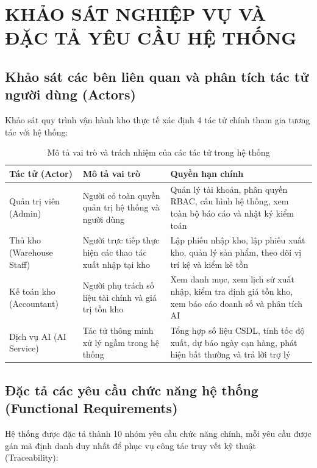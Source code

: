 \chapter{KHẢO SÁT NGHIỆP VỤ VÀ ĐẶC TẢ YÊU CẦU HỆ THỐNG}

\section{Khảo sát các bên liên quan và phân tích tác tử người dùng (Actors)}

Khảo sát quy trình vận hành kho thực tế xác định 4 tác tử chính tham gia tương tác với hệ thống:

\begin{table}[h!]
\centering
\caption{Mô tả vai trò và trách nhiệm của các tác tử trong hệ thống}
\begin{tabular}{|l|l|l|}
\hline
\rowcolor{tablehead}
\textbf{Tác tử (Actor)} & \textbf{Mô tả vai trò} & \textbf{Quyền hạn chính} \\ \hline
Quản trị viên (Admin) & Người có toàn quyền quản trị hệ thống và người dùng & Quản lý tài khoản, phân quyền RBAC, cấu hình hệ thống, xem toàn bộ báo cáo và nhật ký kiểm toán \\ \hline
Thủ kho (Warehouse Staff) & Người trực tiếp thực hiện các thao tác xuất nhập tại kho & Lập phiếu nhập kho, lập phiếu xuất kho, quản lý sản phẩm, theo dõi vị trí kệ và kiểm kê tồn \\ \hline
Kế toán kho (Accountant) & Người phụ trách số liệu tài chính và giá trị tồn kho & Xem danh mục, xem lịch sử xuất nhập, kiểm tra định giá tồn kho, xem báo cáo doanh số và phân tích AI \\ \hline
Dịch vụ AI (AI Service) & Tác tử thông minh xử lý ngầm trong hệ thống & Tổng hợp số liệu CSDL, tính tốc độ xuất, dự báo ngày cạn hàng, phát hiện bất thường và trả lời trợ lý \\ \hline
\end{tabular}
\end{table}

\section{Đặc tả các yêu cầu chức năng hệ thống (Functional Requirements)}

Hệ thống được đặc tả thành 10 nhóm yêu cầu chức năng chính, mỗi yêu cầu được gán mã định danh duy nhất để phục vụ công tác truy vết kỹ thuật (Traceability):

